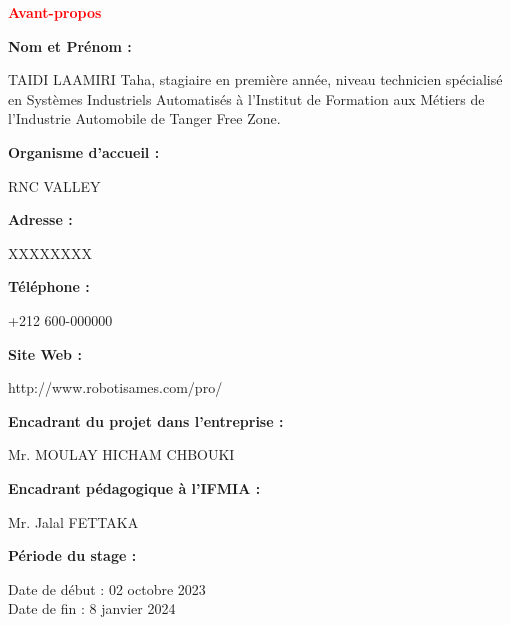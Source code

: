 \documentclass[a4paper,12pt]{report}
\begin{document}
\newpage
\thispagestyle{empty}
\begin{center}
\begin{Huge}
\textcolor{red}{\textbf{Avant-propos}}\\
\vspace{2cm}
\end{Huge}
\end{center}
\textbf{Nom et Prénom :}\\
\begin{center}
    TAIDI LAAMIRI Taha, stagiaire en première année, niveau technicien spécialisé en Systèmes Industriels Automatisés à l'Institut de Formation aux Métiers de l'Industrie Automobile de Tanger Free Zone.\\
\end{center}
\textbf{Organisme d'accueil :}\\
\begin{center}
    RNC VALLEY\\
\end{center}
\textbf{Adresse :}\\
\begin{center}
    XXXXXXXX\\
\end{center}
\textbf{Téléphone :}\\
\begin{center}
    +212 600-000000\\
\end{center}
\textbf{Site Web :}\\
\begin{center}
    http://www.robotisames.com/pro/\\
\end{center}
\textbf{Encadrant du projet dans l'entreprise :}\\
\begin{center}
    Mr. MOULAY HICHAM CHBOUKI\\
\end{center}
\textbf{Encadrant pédagogique à l'IFMIA :}\\
\begin{center}
    Mr. Jalal FETTAKA\\
\end{center}
\textbf{Période du stage :}\\
\begin{center}
    Date de début : 02 octobre 2023\\
    Date de fin : 8 janvier 2024
\end{center}
\setcounter{page}{1}
\tableofcontents
\end{document}

